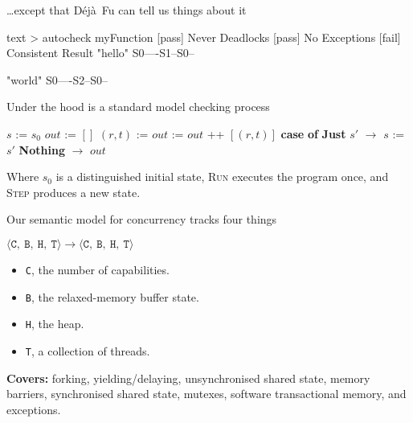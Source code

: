 \documentclass{beamer}
\newcommand{\dejafu}{D\'{e}j\`{a}~Fu}
\begin{document}
\begin{frame}[fragile]{\ldots except that \dejafu{} can tell us things about it}
\begin{center}
\begin{cminted}{text}
> autocheck myFunction
[pass] Never Deadlocks
[pass] No Exceptions
[fail] Consistent Result
    "hello" S0----S1--S0--

    "world" S0----S2--S0--
\end{cminted}
\end{center}
\end{frame}

\begin{frame}{Under the hood is a standard model checking process}
\begin{center}
\begin{minipage}{.6\linewidth}
\begin{algorithmic}
  \State $s$ \hspace{0.22cm} := $s_{0}$
  \State $out$ := $[]$
  \Loop
    \State $(r, t)$ := 
    \State $out$ \hspace{0.16cm} := $out$ ++ $[(r,t)]$
    \State \textbf{case}  \textbf{of}
        \State\hspace{\algorithmicindent} \textbf{Just} $s'$ \hspace{0.25cm} $\rightarrow$ $s$ := $s'$
        \State\hspace{\algorithmicindent} \textbf{Nothing}   $\rightarrow$ \Return $out$
  \EndLoop
\EndFunction
\end{algorithmic}
\end{minipage}
\end{center}

Where $s_{0}$ is a distinguished initial state, \textsc{Run} executes
the program once, and \textsc{Step} produces a new state.
\end{frame}

\begin{frame}{Our semantic model for concurrency tracks four things}
  \begin{center}
    $\langle\texttt{C},~\texttt{B},~\texttt{H},~\texttt{T}\rangle
    \rightarrow
    \langle\texttt{C},~\texttt{B},~\texttt{H},~\texttt{T}\rangle$
  \end{center}

  \begin{itemize}
  \item \texttt{C}, the number of capabilities.
  \item \texttt{B}, the relaxed-memory buffer state.
  \item \texttt{H}, the heap.
  \item \texttt{T}, a collection of threads.
  \end{itemize}

  \textbf{Covers:} forking, yielding/delaying, unsynchronised shared
  state, memory barriers, synchronised shared state, mutexes, software
  transactional memory, and exceptions.
\end{frame}
\end{document}
